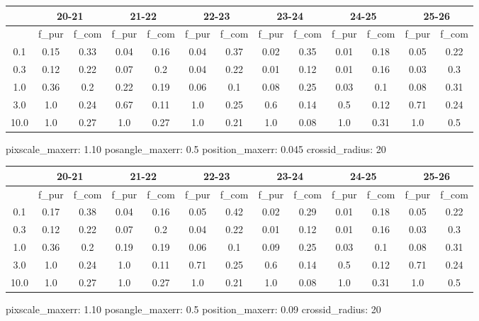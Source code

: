 \documentclass{article}
\begin{document}
\begin{figure}[H]
\centering
\begin{tabular}{|c|c|c|c|c|c|c|c|c|c|c|c|c|}
\hline
\multicolumn{1}{|c|}{} & \multicolumn{2}{|c|}{20-21} & \multicolumn{2}{|c|}{21-22} & \multicolumn{2}{|c|}{22-23} & \multicolumn{2}{|c|}{23-24} & \multicolumn{2}{|c|}{24-25} & \multicolumn{2}{|c|}{25-26}\\
\hline \hline
 & f\_pur & f\_com & f\_pur & f\_com & f\_pur & f\_com & f\_pur & f\_com & f\_pur & f\_com & f\_pur & f\_com \\
\hline
0.1 & 0.15 & 0.33 & 0.04 & 0.16 & 0.04 & 0.37 & 0.02 & 0.35 & 0.01 & 0.18 & 0.05 & 0.22\\
\hline
0.3 & 0.12 & 0.22 & 0.07 & 0.2 & 0.04 & 0.22 & 0.01 & 0.12 & 0.01 & 0.16 & 0.03 & 0.3\\
\hline
1.0 & 0.36 & 0.2 & 0.22 & 0.19 & 0.06 & 0.1 & 0.08 & 0.25 & 0.03 & 0.1 & 0.08 & 0.31\\
\hline
3.0 & 1.0 & 0.24 & 0.67 & 0.11 & 1.0 & 0.25 & 0.6 & 0.14 & 0.5 & 0.12 & 0.71 & 0.24\\
\hline
10.0 & 1.0 & 0.27 & 1.0 & 0.27 & 1.0 & 0.21 & 1.0 & 0.08 & 1.0 & 0.31 & 1.0 & 0.5\\
\hline
\end{tabular}
\caption{pixscale\_maxerr: 1.10 posangle\_maxerr: 0.5 position\_maxerr: 0.045 crossid\_radius: 20}
\end{figure}

\begin{figure}[H]
\centering
\begin{tabular}{|c|c|c|c|c|c|c|c|c|c|c|c|c|}
\hline
\multicolumn{1}{|c|}{} & \multicolumn{2}{|c|}{20-21} & \multicolumn{2}{|c|}{21-22} & \multicolumn{2}{|c|}{22-23} & \multicolumn{2}{|c|}{23-24} & \multicolumn{2}{|c|}{24-25} & \multicolumn{2}{|c|}{25-26}\\
\hline \hline
 & f\_pur & f\_com & f\_pur & f\_com & f\_pur & f\_com & f\_pur & f\_com & f\_pur & f\_com & f\_pur & f\_com \\
\hline
0.1 & 0.17 & 0.38 & 0.04 & 0.16 & 0.05 & 0.42 & 0.02 & 0.29 & 0.01 & 0.18 & 0.05 & 0.22\\
\hline
0.3 & 0.12 & 0.22 & 0.07 & 0.2 & 0.04 & 0.22 & 0.01 & 0.12 & 0.01 & 0.16 & 0.03 & 0.3\\
\hline
1.0 & 0.36 & 0.2 & 0.19 & 0.19 & 0.06 & 0.1 & 0.09 & 0.25 & 0.03 & 0.1 & 0.08 & 0.31\\
\hline
3.0 & 1.0 & 0.24 & 1.0 & 0.11 & 0.71 & 0.25 & 0.6 & 0.14 & 0.5 & 0.12 & 0.71 & 0.24\\
\hline
10.0 & 1.0 & 0.27 & 1.0 & 0.27 & 1.0 & 0.21 & 1.0 & 0.08 & 1.0 & 0.31 & 1.0 & 0.5\\
\hline
\end{tabular}
\caption{pixscale\_maxerr: 1.10 posangle\_maxerr: 0.5 position\_maxerr: 0.09 crossid\_radius: 20}
\end{figure}
\end{document}
